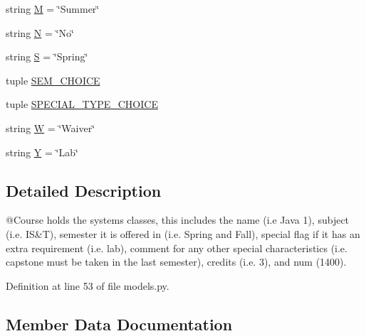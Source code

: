 \begin{DoxyCompactItemize}
\item 
string \mbox{\hyperlink{classlanding_1_1models_1_1Course_ae7b25314cb92ae2a3028d7b040f16ed5}{M}} = \char`\"{}Summer\char`\"{}
\item 
string \mbox{\hyperlink{classlanding_1_1models_1_1Course_a228c31655e120c1bf499f848c70534e9}{N}} = \char`\"{}No\char`\"{}
\item 
string \mbox{\hyperlink{classlanding_1_1models_1_1Course_a91e4bb24a46ec40f82d0d1c8bb1f5705}{S}} = \char`\"{}Spring\char`\"{}
\item 
tuple \mbox{\hyperlink{classlanding_1_1models_1_1Course_af5c611e98c1a5fc7ee9c7f072af17631}{S\+E\+M\+\_\+\+C\+H\+O\+I\+CE}}
\item 
tuple \mbox{\hyperlink{classlanding_1_1models_1_1Course_ac0a930e2ca556697d478cb97a894568b}{S\+P\+E\+C\+I\+A\+L\+\_\+\+T\+Y\+P\+E\+\_\+\+C\+H\+O\+I\+CE}}
\item 
string \mbox{\hyperlink{classlanding_1_1models_1_1Course_af5424af7cbb7df0adff059a54ddbf933}{W}} = \char`\"{}Waiver\char`\"{}
\item 
string \mbox{\hyperlink{classlanding_1_1models_1_1Course_a00ccedd8d49ed021b01bbe1aea40ebe3}{Y}} = \char`\"{}Lab\char`\"{}
\end{DoxyCompactItemize}


\subsection{Detailed Description}
\begin{DoxyVerb}@Course holds the systems classes, this includes the
        name (i.e Java 1), subject (i.e. IS&T), semester it is offered in (i.e. Spring and Fall),
        special flag if it has an extra requirement (i.e. lab), comment for any other special
        characteristics (i.e. capstone must be taken in the last semester),
        credits (i.e. 3), and num (1400).
\end{DoxyVerb}
 

Definition at line 53 of file models.\+py.



\subsection{Member Data Documentation}
\mbox{\label{classlanding_1_1models_1_1Course_a9a6614f90db0d81754b98a123c43ecef}} 
